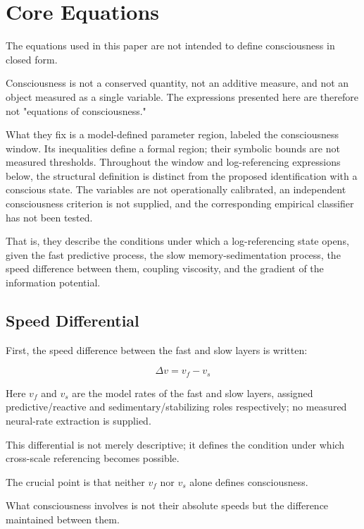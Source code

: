 \section{Core Equations}


The equations used in this paper are not intended to define consciousness in closed form.

Consciousness is not a conserved quantity, not an additive measure, and not an object measured as a single variable. The expressions presented here are therefore not "equations of consciousness."

What they fix is a model-defined parameter region, labeled the consciousness window. Its inequalities define a formal region; their symbolic bounds are not measured thresholds. Throughout the window and log-referencing expressions below, the structural definition is distinct from the proposed identification with a conscious state. The variables are not operationally calibrated, an independent consciousness criterion is not supplied, and the corresponding empirical classifier has not been tested.

That is, they describe the conditions under which a log-referencing state opens, given the fast predictive process, the slow memory-sedimentation process, the speed difference between them, coupling viscosity, and the gradient of the information potential.

\subsection{Speed Differential}


First, the speed difference between the fast and slow layers is written:

\begin{equation}
\Delta v = v_f - v_s
\end{equation}

Here $v_f$ and $v_s$ are the model rates of the fast and slow layers, assigned predictive/reactive and sedimentary/stabilizing roles respectively; no measured neural-rate extraction is supplied.

This differential is not merely descriptive; it defines the condition under which cross-scale referencing becomes possible.

The crucial point is that neither $v_f$ nor $v_s$ alone defines consciousness.

What consciousness involves is not their absolute speeds but the difference maintained between them.

